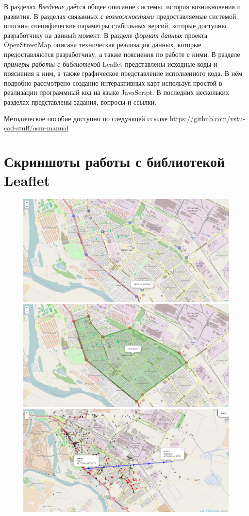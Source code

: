 \documentclass[a4paper, 14pt]{extreport}
\begin{document}
    В разделах \emph{Введение} даётся общее описание системы, история возникновения и развития. В разделах 
    связанных с \emph{возможностями} предоставляемые системой описаны специфические параметры стабильных 
    версий, которые доступны разработчику на данный момент. В разделе \emph{формат данных} проекта 
    OpenStreetMap описана техническая реализация данных, которые предоставляются разработчику, а также 
    пояснения по работе с ними. В разделе \emph{примеры работы с библиотекой} Leaflet представлены исходные 
    коды и пояснения к ним, а также графическое представление исполненного кода. В нём подробно рассмотрено 
    создание интерактивных карт используя простой в реализации программный код на языке JavaScript. 
    В последних нескольких разделах представлены задания, вопросы и ссылки.

    Методическое пособие доступно по следующей ссылке \url{https://github.com/vstu-cad-stuff/osm-manual}

    \chapter{Скриншоты работы с библиотекой Leaflet}
    \begin{figure}[ht!]
        \center
        \includegraphics[width=.9\textwidth]{e1} \\[.5em]
        \includegraphics[width=.9\textwidth]{e2} \\[.5em]
        \includegraphics[width=.9\textwidth]{e3}
    \end{figure}
\end{document}
